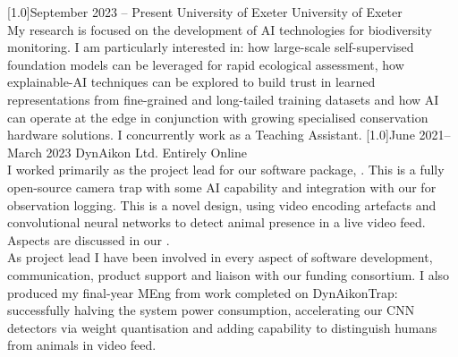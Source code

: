 \documentclass[]{cv-style}     %
\begin{document}
\begin{entrylist}
\entry
{\scalebox{.8}[1.0]{September 2023 -- Present}}
  {University of Exeter}
  {University of Exeter}
  {\\
  My research is focused on the development of AI technologies for biodiversity monitoring. I am particularly interested in: how large-scale self-supervised foundation models can be leveraged for rapid ecological assessment, how explainable-AI techniques can be explored to build trust in learned representations from fine-grained and long-tailed training datasets and how AI can operate at the edge in conjunction with growing specialised conservation hardware solutions. I concurrently work as a Teaching Assistant.
  }
\entry
  {\scalebox{.8}[1.0]{June 2021--March 2023}}
  {DynAikon Ltd.}
  {Entirely Online}
  {\\
  I worked primarily as the project lead for our software package, . This is a fully open-source camera trap with some AI capability and integration with our  for observation logging. This is a novel design, using video encoding artefacts and convolutional neural networks to detect animal presence in a live video feed. Aspects are discussed in our . 
  \\
  As project lead I have been involved in every aspect of software development, communication, product support and liaison with our funding consortium. I also produced my final-year MEng  from work completed on DynAikonTrap: successfully halving the system power consumption, accelerating our CNN detectors via weight quantisation and adding capability to distinguish humans from animals in video feed. 
}
\end{entrylist}
\end{document}
